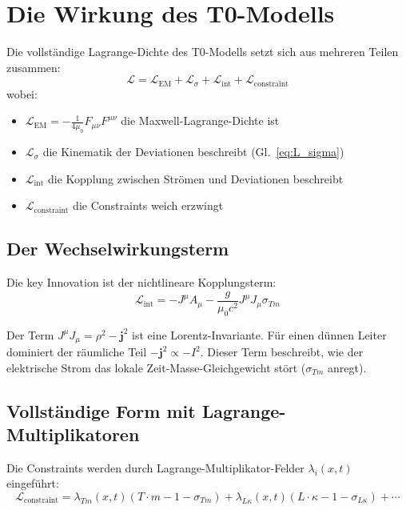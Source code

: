\documentclass[10pt, a4paper]{article}
\begin{document}
	\section{Die Wirkung des T0-Modells}
	Die vollständige Lagrange-Dichte des T0-Modells setzt sich aus mehreren Teilen zusammen:
	\begin{equation}
		\mathcal{L} = \mathcal{L}_{\text{EM}} + \mathcal{L}_{\sigma} + \mathcal{L}_{\text{int}} + \mathcal{L}_{\text{constraint}} \label{eq:full_L}
	\end{equation}
	wobei:
	\begin{itemize}
		\item $\mathcal{L}_{\text{EM}} = -\frac{1}{4\mu_0} F_{\mu\nu} F^{\mu\nu}$ die Maxwell-Lagrange-Dichte ist
		\item $\mathcal{L}_{\sigma}$ die Kinematik der Deviationen beschreibt (Gl.~\ref{eq:L_sigma})
		\item $\mathcal{L}_{\text{int}}$ die Kopplung zwischen Strömen und Deviationen beschreibt
		\item $\mathcal{L}_{\text{constraint}}$ die Constraints weich erzwingt
	\end{itemize}
	
	\subsection{Der Wechselwirkungsterm}
	Die key Innovation ist der nichtlineare Kopplungsterm:
	\begin{equation}
		\mathcal{L}_{\text{int}} = -J^\mu A_\mu - \frac{g}{\mu_0 c^2} J^\mu J_\mu \sigma_{Tm} \label{eq:L_int}
	\end{equation}
	
	Der Term $J^\mu J_\mu = \rho^2 - \mathbf{j}^2$ ist eine Lorentz-Invariante. Für einen dünnen Leiter dominiert der räumliche Teil $-\mathbf{j}^2 \propto -I^2$. Dieser Term beschreibt, wie der elektrische Strom das lokale Zeit-Masse-Gleichgewicht stört ($\sigma_{Tm}$ anregt).
	
	\subsection{Vollständige Form mit Lagrange-Multiplikatoren}
	Die Constraints werden durch Lagrange-Multiplikator-Felder $\lambda_i(x,t)$ eingeführt:
	\begin{equation}
		\mathcal{L}_{\text{constraint}} = \lambda_{Tm}(x,t) (T \cdot m - 1 - \sigma_{Tm}) + \lambda_{L\kappa}(x,t) (L \cdot \kappa - 1 - \sigma_{L\kappa}) + \cdots \label{eq:L_constraint}
	\end{equation}
	
\end{document}
